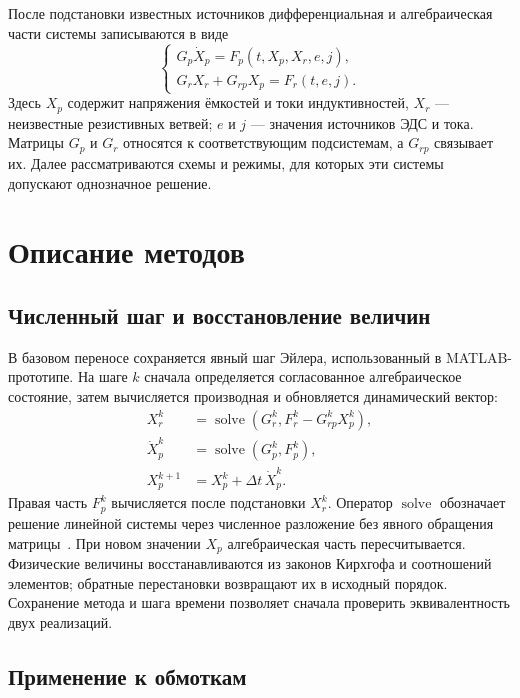 \documentclass{misisarticle}
\newcommand{\solve}{\operatorname{solve}}
\begin{document}
После подстановки известных источников дифференциальная и алгебраическая части системы записываются в виде
\begin{equation}
\begin{cases}
  G_p\dot X_p=F_p(t,X_p,X_r,e,j),\\
  G_rX_r+G_{rp}X_p=F_r(t,e,j).
\end{cases}
\label{eq:dae}
\end{equation}
Здесь $X_p$ содержит напряжения ёмкостей и токи индуктивностей, $X_r$ --- неизвестные резистивных ветвей; $e$ и $j$ --- значения источников ЭДС и тока. Матрицы $G_p$ и $G_r$ относятся к соответствующим подсистемам, а $G_{rp}$ связывает их. Далее рассматриваются схемы и режимы, для которых эти системы допускают однозначное решение.

\section{Описание методов}

\subsection{Численный шаг и восстановление величин}

В базовом переносе сохраняется явный шаг Эйлера, использованный в MATLAB-прототипе. На шаге $k$ сначала определяется согласованное алгебраическое состояние, затем вычисляется производная и обновляется динамический вектор:
\begin{equation}
\begin{aligned}
  X_r^k&=\solve(G_r^k,F_r^k-G_{rp}^kX_p^k),\\
  \dot X_p^k&=\solve(G_p^k,F_p^k),\\
  X_p^{k+1}&=X_p^k+\Delta t\,\dot X_p^k .
\end{aligned}
\label{eq:euler}
\end{equation}
Правая часть $F_p^k$ вычисляется после подстановки $X_r^k$. Оператор $\solve$ обозначает решение линейной системы через численное разложение без явного обращения матрицы~\cite{golub2013}. При новом значении $X_p$ алгебраическая часть пересчитывается. Физические величины восстанавливаются из законов Кирхгофа и соотношений элементов; обратные перестановки возвращают их в исходный порядок. Сохранение метода и шага времени позволяет сначала проверить эквивалентность двух реализаций.

\subsection{Применение к обмоткам}
\end{document}
